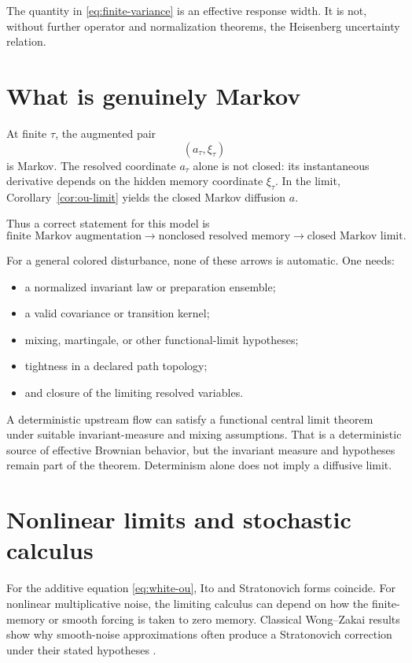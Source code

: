 \documentclass[11pt]{article}
\begin{document}
The quantity in \eqref{eq:finite-variance} is an effective response width.
It is not, without further operator and normalization theorems, the
Heisenberg uncertainty relation.

\section{What is genuinely Markov}

At finite \(\tau\), the augmented pair
\[
(a_\tau,\xi_\tau)
\]
is Markov. The resolved coordinate \(a_\tau\) alone is not closed: its
instantaneous derivative depends on the hidden memory coordinate
\(\xi_\tau\). In the limit, Corollary~\ref{cor:ou-limit} yields the closed
Markov diffusion \(a\).

Thus a correct statement for this model is
\[
\boxed{
\text{finite Markov augmentation}
\longrightarrow
\text{nonclosed resolved memory}
\longrightarrow
\text{closed Markov limit}.
}
\]

For a general colored disturbance, none of these arrows is automatic.
One needs:
\begin{itemize}
\item a normalized invariant law or preparation ensemble;
\item a valid covariance or transition kernel;
\item mixing, martingale, or other functional-limit hypotheses;
\item tightness in a declared path topology;
\item and closure of the limiting resolved variables.
\end{itemize}

A deterministic upstream flow can satisfy a functional central limit theorem
under suitable invariant-measure and mixing assumptions. That is a
deterministic source of effective Brownian behavior, but the invariant measure
and hypotheses remain part of the theorem. Determinism alone does not imply a
diffusive limit.

\section{Nonlinear limits and stochastic calculus}

For the additive equation \eqref{eq:white-ou}, Ito and Stratonovich forms
coincide. For nonlinear multiplicative noise, the limiting calculus can depend
on how the finite-memory or smooth forcing is taken to zero memory. Classical
Wong--Zakai results show why smooth-noise approximations often produce a
Stratonovich correction under their stated hypotheses
\cite{WongZakai1965}.
\end{document}
